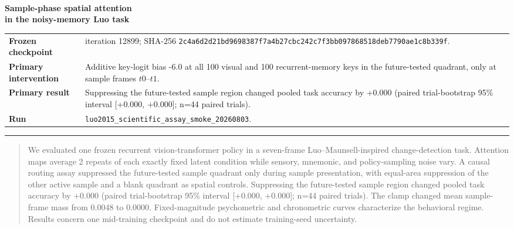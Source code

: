 \documentclass[10pt]{article}
\begin{document}
\begin{titlepage}
\thispagestyle{empty}\vspace*{10mm}{\color{Blue}\rule{\textwidth}{2.2pt}}\\[8mm]
{\fontsize{25}{30}\selectfont\bfseries Sample-phase spatial attention\\in the noisy-memory Luo task\par}
\vfill
\begin{tabularx}{\textwidth}{@{}p{4.0cm}X@{}}\toprule
\textbf{Frozen checkpoint} & iteration 12899; SHA-256 \texttt{2c4a6d2d21bd9698387f7a4b27cbc242c7f3bb097868518deb7790ae1c8b339f}.\\
\textbf{Primary intervention} & Additive key-logit bias -6.0 at all 100 visual and 100 recurrent-memory keys in the future-tested quadrant, only at sample frames $t0$--$t1$.\\
\textbf{Primary result} & Suppressing the future-tested sample region changed pooled task accuracy by +0.000 (paired trial-bootstrap 95\% interval [+0.000, +0.000]; n=44 paired trials).\\
\textbf{Run} & \texttt{luo2015\_scientific\_assay\_smoke\_20260803}.\\\bottomrule
\end{tabularx}
\vfill{\color{Blue}\rule{\textwidth}{2.2pt}}
\end{titlepage}

\begin{abstract}
We evaluated one frozen recurrent vision-transformer policy in a seven-frame Luo--Maunsell-inspired change-detection task. Attention maps average 2 repeats of each exactly fixed latent condition while sensory, mnemonic, and policy-sampling noise vary. A causal routing assay suppressed the future-tested sample quadrant only during sample presentation, with equal-area suppression of the other active sample and a blank quadrant as spatial controls. Suppressing the future-tested sample region changed pooled task accuracy by +0.000 (paired trial-bootstrap 95\% interval [+0.000, +0.000]; n=44 paired trials). The clamp changed mean sample-frame mass from 0.0048 to 0.0000. Fixed-magnitude psychometric and chronometric curves characterize the behavioral regime. Results concern one mid-training checkpoint and do not estimate training-seed uncertainty.
\end{abstract}
\end{document}
